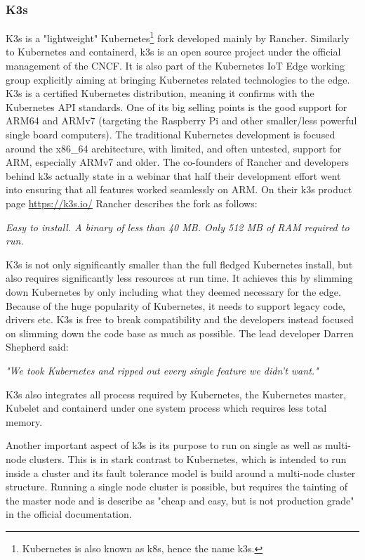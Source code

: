 \subsubsection{K3s}
K3s is a "lightweight" Kubernetes\footnote{Kubernetes is also known as k8s, hence the name k3s.} fork developed mainly by Rancher\cite{rancherMainPage:online}. Similarly to Kubernetes and containerd, k3s is an open source project under the official management of the CNCF. It is also part of the Kubernetes IoT Edge working group explicitly aiming at bringing Kubernetes related technologies to the edge. K3s is a certified Kubernetes distribution, meaning it confirms with the Kubernetes API standards. One of its big selling points is the good support for ARM64 and ARMv7 (targeting the Raspberry Pi and other smaller/less powerful single board computers). The traditional Kubernetes development is focused around the x86\_64 architecture, with limited, and often untested, support for ARM, especially ARMv7 and older. The co-founders of Rancher and developers behind k3s actually state in a webinar that half their development effort went into ensuring that all features worked seamlessly on ARM\cite{k3sTalk:online}.
On their k3s product page \url{https://k3s.io/} Rancher describes the fork as follows:
\begin{displayquote}
\textit{Easy to install. A binary of less than 40 MB. Only 512 MB of RAM required to run.}
\end{displayquote}
K3s is not only significantly smaller than the full fledged Kubernetes install, but also requires significantly less resources at run time. It achieves this by slimming down Kubernetes by only including what they deemed necessary for the edge. Because of the huge popularity of Kubernetes, it needs to support legacy code, drivers etc. K3s is free to break compatibility and the developers instead focused on slimming down the code base as much as possible. The lead developer Darren Shepherd said:
\begin{displayquote}
\textit{"We took Kubernetes and ripped out every single feature we didn't want.\cite{k3sTalk:online}"}
\\[1pt]
\end{displayquote}
K3s also integrates all process required by Kubernetes, the Kubernetes master, Kubelet and containerd under one system process which requires less total memory.

Another important aspect of k3s is its purpose to run on single as well as multi-node clusters. This is in stark contrast to Kubernetes, which is intended to run inside a cluster and its fault tolerance model is build around a multi-node cluster structure. Running a single node cluster is possible, but requires the tainting of the master node and is describe as "cheap and easy, but is not production grade" in the official documentation\cite{singleNodeKubernetesNotProductionDocumenhtation:online}.

